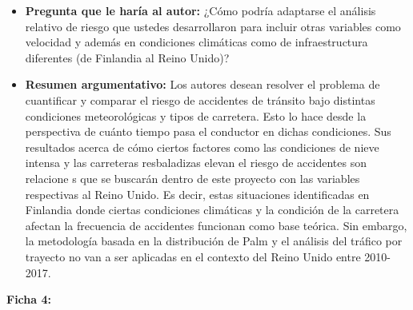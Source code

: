 \documentclass[12pt]{article}
\begin{document}
\begin{itemize}
	\item \textbf{Pregunta que le haría al autor:} ¿Cómo podría adaptarse el análisis relativo de riesgo que ustedes desarrollaron para incluir otras variables como velocidad y además en condiciones climáticas como de infraestructura diferentes (de Finlandia al Reino Unido)?    
 
	\item \textbf{Resumen argumentativo:} Los autores desean resolver el problema de cuantificar
     y comparar el riesgo de accidentes de tránsito bajo distintas condiciones meteorológicas 
     y tipos de carretera. Esto lo hace desde la perspectiva de cuánto tiempo pasa el conductor 
     en dichas condiciones. Sus resultados acerca de cómo ciertos factores como las condiciones 
     de nieve intensa y las carreteras resbaladizas elevan el riesgo de accidentes son relacione
     s que se buscarán dentro de este proyecto con las variables respectivas al Reino Unido. 
     Es decir, estas situaciones identificadas en Finlandia donde ciertas condiciones climáticas 
     y la condición de la carretera afectan la frecuencia de accidentes funcionan como base 
     teórica. Sin embargo, la metodología basada en la distribución de Palm y el análisis 
     del tráfico por trayecto no van a ser aplicadas en el contexto del Reino Unido entre 
     2010-2017. \\  
\end{itemize}


\textbf{Ficha 4:}
\end{document}
